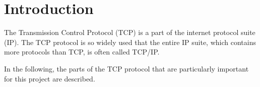 \section{Introduction}	
The Transmission Control Protocol (TCP) is a part of the internet protocol suite (IP). The TCP protocol is so widely used that the entire IP suite, which contains more protocols than TCP, is often called TCP/IP.

In the following, the parts of the TCP protocol that are particularly important for this project are described.